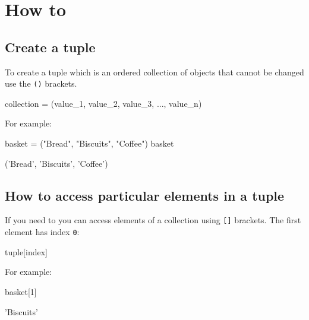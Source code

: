 \section{How to}
\label{\detokenize{tools-for-mathematics/05-combinations-permutations/how/main:how}}\label{\detokenize{tools-for-mathematics/05-combinations-permutations/how/main::doc}}

\subsection{Create a tuple}
\label{sec:create_a_tuple}

To create a tuple which is an ordered collection of objects that cannot be
changed use the \texttt{()} brackets.


\begin{api}
collection = (value_1, value_2, value_3, ..., value_n)
\end{api}



For example:




\begin{pyin}
basket = ("Bread", "Biscuits", "Coffee")
basket
\end{pyin}





\begin{raw}
('Bread', 'Biscuits', 'Coffee')
\end{raw}

\subsection{How to access particular elements in a tuple}
\label{sec:how-to-access-particular-elements-in-a-tuple}

If you need to you can access elements of a collection using \texttt{[]} brackets. The
first element has index \texttt{0}:

\begin{api}
tuple[index]
\end{api}


For example:




\begin{pyin}
basket[1]
\end{pyin}





\begin{raw}
'Biscuits'
\end{raw}





